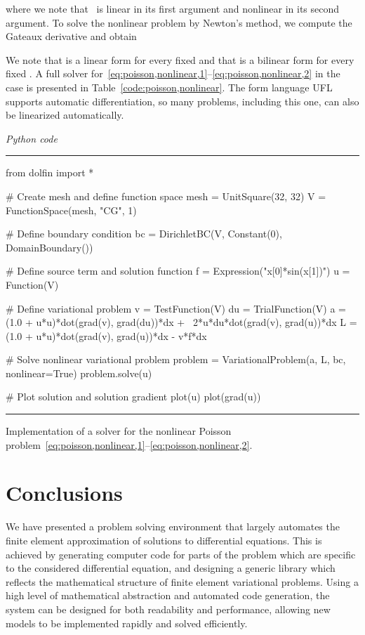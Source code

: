 \documentclass[acmtoms]{acmtrans2m}
\newenvironment{pythoncode}[1]{\center\minipage{#1\textwidth}\footnotesize\hfill\it Python code \rm\vspace{0.1cm}\hrule\renewcommand{\baselinestretch}{0.9}\footnotesize\verbatim}{\endverbatim\hrule\normalsize\endminipage\newline\endcenter}
\begin{document}
where we note that~ is linear in its
first argument and nonlinear in its second argument. To solve the
nonlinear problem by Newton's method, we compute the Gateaux
derivative  and obtain

We note that  is a linear form for
every fixed  and that  is a bilinear form for every fixed . A full
solver
for~\eqref{eq:poisson,nonlinear,1}--\eqref{eq:poisson,nonlinear,2} in
the case  is presented in
Table~\ref{code:poisson,nonlinear}.
The form language UFL supports automatic differentiation, so many problems,
including this one, can also be linearized automatically.
\begin{table}
\begin{pythoncode}{0.9}
from dolfin import *

# Create mesh and define function space
mesh = UnitSquare(32, 32)
V = FunctionSpace(mesh, "CG", 1)

# Define boundary condition
bc = DirichletBC(V, Constant(0), DomainBoundary())

# Define source term and solution function
f = Expression("x[0]*sin(x[1])")
u = Function(V)

# Define variational problem
v  = TestFunction(V)
du = TrialFunction(V)
a  = (1.0 + u*u)*dot(grad(v), grad(du))*dx + \
     2*u*du*dot(grad(v), grad(u))*dx
L  = (1.0 + u*u)*dot(grad(v), grad(u))*dx - v*f*dx

# Solve nonlinear variational problem
problem = VariationalProblem(a, L, bc, nonlinear=True)
problem.solve(u)

# Plot solution and solution gradient
plot(u)
plot(grad(u))
\end{pythoncode}
\caption{Implementation of a solver for the nonlinear Poisson
  problem~\eqref{eq:poisson,nonlinear,1}--\eqref{eq:poisson,nonlinear,2}.}
\label{code:poisson,nonlinear}
\end{table}
\section{Conclusions}
\label{sec:conclusions}
We have presented a problem solving environment that largely automates
the finite element approximation of solutions to differential
equations. This is achieved by generating computer code for parts of
the problem which are specific to the considered differential
equation, and designing a generic library which reflects the
mathematical structure of finite element variational problems. Using a
high level of mathematical abstraction and automated code generation,
the system can be designed for both readability and performance,
allowing new models to be implemented rapidly and solved efficiently.
\end{document}
